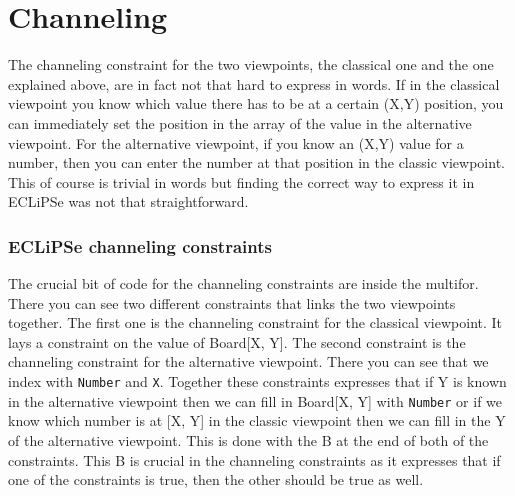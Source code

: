 \documentclass{report}
\begin{document}
\section{Channeling}
The channeling constraint for the two viewpoints, the classical one and the one explained above, are in fact not that hard to express in words. If in the classical viewpoint you know which value there has to be at a certain (X,Y) position, you can immediately set the position in the array of the value in the alternative viewpoint. For the alternative viewpoint, if you know an (X,Y) value for a number, then you can enter the number at that position in the classic viewpoint. This of course is trivial in words but finding the correct way to express it in ECLiPSe was not that straightforward.

\subsubsection{ECLiPSe channeling constraints}

The crucial bit of code for the channeling constraints are inside the multifor. There you can see two different constraints that links the two viewpoints together. The first one is the channeling constraint for the classical viewpoint. It lays a constraint on the value of Board[X, Y]. The second constraint is the channeling constraint for the alternative viewpoint. There you can see that we index with \texttt{Number} and \texttt{X}. Together these constraints expresses that if Y is known in the alternative viewpoint then we can fill in Board[X, Y] with \texttt{Number} or if we know which number is at [X, Y] in the classic viewpoint then we can fill in the Y of the alternative viewpoint. This is done with the B at the end of both of the constraints. This B is crucial in the channeling constraints as it expresses that if one of the constraints is true, then the other should be true as well.

\newpage
\end{document}

